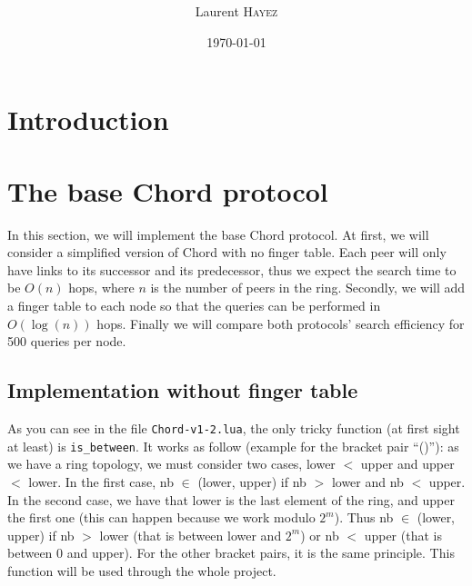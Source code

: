 \message{ !name(LSDS_project2_hayezl.tex)}\documentclass[a4paper, 11pt]{article}
\title{%
  \normalfont{\bfseries{\rule{\linewidth}{2pt} Large-Scale Distributed Systems\\Project 2: Distributed Hash Tables\\ %
    \vspace{-0.4cm}  \rule{\linewidth}{2pt}}}
  }
\author{Laurent \textsc{Hayez}}
\date{\today}
\theoremstyle{plain}
\theoremstyle{definition}
\begin{document}




\renewcommand{\proofname}{{\scshape Proof}}
\renewcommand{\labelitemi}{\textbullet}


\maketitle

\renewcommand{\contentsname}{Table of contents}
\tableofcontents



\section{Introduction}
\label{sec:introduction}

  


\section{The base Chord protocol}
\label{sec:base-chord-protocol}

  In this section, we will implement the base Chord protocol. At first, we will consider a simplified version
  of Chord with no finger table. Each peer will only have links to its successor and its predecessor, thus we
  expect the search time to be $O(n)$ hops, where $n$ is the number of peers in the ring. Secondly, we will add a
  finger table to each node so that the queries can be performed in $O(\log(n))$ hops. Finally we will compare
  both protocols' search efficiency for 500 queries per node.

  \subsection{Implementation without finger table}
  \label{sec:implementation-without-ft}
  
    As you can see in the file \texttt{Chord-v1-2.lua}, the only tricky function (at first sight at least) is
    \texttt{is\_between}. It works as follow (example for the bracket pair ``()''): as we have a ring topology, we
    must consider two cases, lower $<$ upper and upper $<$ lower. In the first case, nb $\in$ (lower, upper)
    if nb $>$ lower and nb $<$ upper. In the second case, we have that lower is the last element of the ring,
    and upper the first one (this can happen because we work modulo $2^m$). Thus nb $\in$ (lower, upper) if nb
    $>$ lower (that is between lower and $2^m$) or nb $<$ upper (that is between $0$ and upper). For the other
    bracket pairs, it is the same principle. This function will be used through the whole project.
\end{document}
